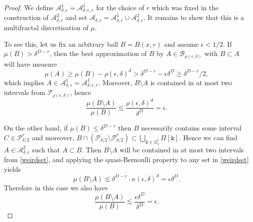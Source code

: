 \documentclass[10pt,a4paper]{amsart}
\def\A{\ensuremath{\mathscr A}}
\renewcommand{\k}{\mathtt{k}}
\begin{document}
\begin{proof}
We define $\A^1_{\delta,\epsilon}=\A^1_{\delta,\epsilon,r}$ for the choice of $r$ which was fixed in the construction of $\A^2_{\delta,\epsilon}$ and set $\A_{\delta,\epsilon}=\A^1_{\delta,\epsilon} \cup \A^2_{\delta,\epsilon}$. It remains to show that this is a multifractal discretisation of $\mu$.

To see this, let us fix an arbitrary ball $B=B(x,r)$ and assume $\epsilon<1/2$. If $\mu(B)>\delta^{D-r}$, then the best approximation of $B$ by $A \in \mathcal{B}_{\rho(\epsilon,\delta)}$ with $B \subset A$ will have measure
$$\mu(A) \geq \mu(B)-\rho(\epsilon,\delta)^{d}>\delta^{D-r}-\epsilon \delta^{D} \ge \delta^{D-r}/2,$$ which implies $A \in \A^1_{\delta,\epsilon}=\A^1_{\delta,\epsilon,r}$. Moreover, $B \setminus A$ is contained in at most two intervals from $\mathscr{P}_{\rho(\epsilon,\delta)}$, hence
$$\frac{\mu(B \setminus A)}{\mu(B)} \lesssim\frac{\rho(\epsilon,\delta)^{d}}{\delta^{D}}=\epsilon.$$

On the other hand, if $\mu(B)\leq\delta^{D-r}$ then $B$ necessarily contains some interval $C \in \mathscr{P}_{\delta/2}^r$ and moreover, $B \cap(\mathscr{P}_{\delta/2}\setminus \mathscr{P}_{\delta/2}^r) \subset \bigcup_{\k \in\mathcal{Q}_\delta^r} \Pi[\k]$. Hence we can find $A \in  \A^2_{\delta,\epsilon}$ such that $A \subset B$. Then $B \setminus A$ will be contained in at most two intervals from \eqref{weirdset}, and applying the quasi-Bernoulli property to any set in \eqref{weirdset} yields 
$$\mu(B \setminus A) \lesssim \delta^{D-r} \cdot \kappa(\epsilon,\delta)^{d}=\epsilon\delta^{D}.$$
Therefore in this case we also have
$$\frac{\mu(B \setminus A)}{\mu(B)} \lesssim\frac{\epsilon\delta^{D}}{\delta^{D}}=\epsilon.$$

\end{proof}
\end{document}
